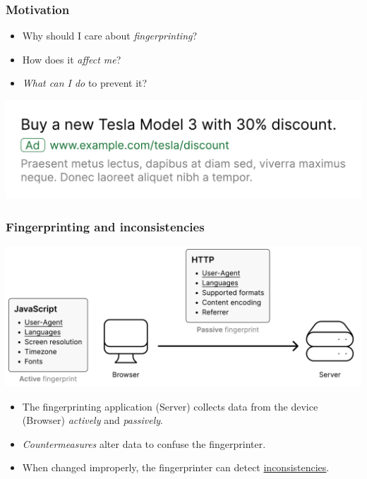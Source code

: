 \begin{frame}
	\frametitle{Motivation}
  
	\begin{itemize}
  		\item Why should I care about \emph{fingerprinting}?
    	\item How does it \emph{affect me}?
    	\item \emph{What can I do} to prevent it?
  	\end{itemize}
  
  	\bigskip

  	\includegraphics[width=\textwidth]{img/tesla_ad.pdf}
\end{frame}

\begin{frame}
	\frametitle{Fingerprinting and inconsistencies}
	\includegraphics[width=\textwidth]{img/schema.pdf}
  
	\bigskip
  
	\begin{itemize}
		\item The fingerprinting application (Server) collects data from the device (Browser) \emph{actively} and \emph{passively}.
		\item \emph{Countermeasures} alter data to confuse the fingerprinter.
		\item When changed improperly, the fingerprinter can detect \underline{inconsistencies}.
	\end{itemize}
\end{frame}

